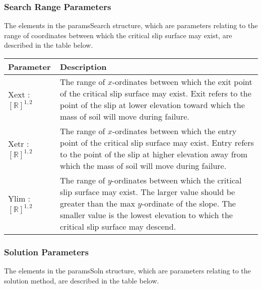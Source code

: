 \documentclass[12pt, titlepage]{article}
\begin{document}
\subsubsection{Search Range Parameters} \label{Tbl:SearchParam}
\noindent
The elements in the paramsSearch structure, which are parameters relating to 
the range of coordinates between which the critical slip surface may exist, are 
described in the table below.

\begin{center}
\begin{tabular}{ p{}
    p{}}\hline 

  \textbf{Parameter} &
  \textbf{Description}\\ \hline

  Xext : $[\mathbb{R}]^{1,2}$ & The range of $x$-ordinates between which the 
  exit point of the critical slip surface may exist. Exit refers
  to the point of the slip at lower elevation toward which the mass of soil will
  move during failure. \\

  Xetr : $[\mathbb{R}]^{1,2}$ & The range of $x$-ordinates between which the
  entry point of the critical slip surface may exist. Entry
  refers to the point of the slip at higher elevation away from which the
  mass of soil will move during failure. \\

  Ylim : $[\mathbb{R}]^{1,2}$ & The range of $y$-ordinates between which
  the critical slip surface may exist. The larger value should be
  greater than the max $y$-ordinate of the slope. The smaller
  value is the lowest elevation to which the critical slip surface may 
  descend.\\ \hline
\end{tabular}
\end{center}

\subsubsection{Solution Parameters} \label{Tbl:SolnParam}
\noindent
The elements in the paramsSoln structure, which are parameters relating to the 
solution method, are described in the table below.
\end{document}
